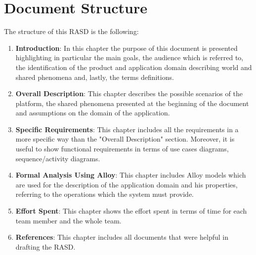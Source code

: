 \section{Document Structure}
The structure of this RASD is the following:
\begin{enumerate}   
    \item \textbf{Introduction}: In this chapter the purpose of this document is presented highlighting in particular the main goals, 
    the audience which is referred to, the identification of the product and application domain  describing world and shared phenomena and, 
    lastly, the terms definitions.
    \item \textbf{Overall Description}: This chapter describes the possible scenarios of the platform, the shared phenomena presented at the 
    beginning of the document and assumptions on the domain of the application.
    \item \textbf{Specific Requirements}: This chapter includes all the requirements in a more specific way than the "Overall Description" section. 
    Moreover, it is useful to show functional requirements in terms of use cases diagrams, sequence/activity diagrams.
    \item \textbf{Formal Analysis Using Alloy}: This chapter includes Alloy models which are used for the description of the application domain and 
    his properties, referring to the operations which the system must provide.
    \item \textbf{Effort Spent}: This chapter shows the effort spent in terms of time for each team member and the whole team.
    \item \textbf{References}: This chapter includes all documents that were helpful in drafting the RASD.
\end{enumerate}